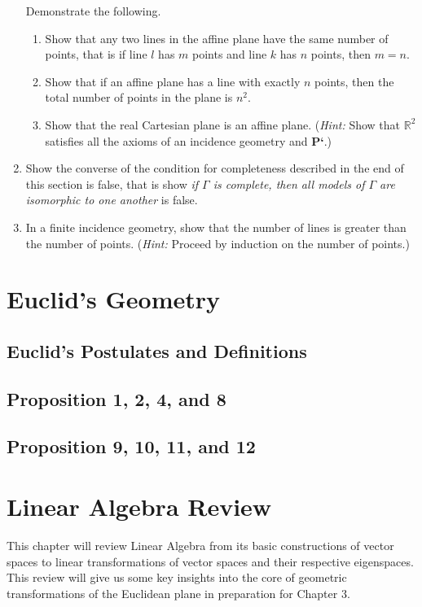 \documentclass[12pt]{book}
\def\R{{\mathbb{R}}}
\begin{document}
\begin{enumerate}
Demonstrate the following.
\begin{enumerate}
	\item Show that any two lines in the affine plane have the same number of points, that is if line $l$ has $m$ points and line $k$ has $n$ points, then $m=n$.
	\item Show that if an affine plane has a line with exactly $n$ points, then the total number of points in the plane is $n^2$.
	\item Show that the real Cartesian plane is an affine plane. (\textit{Hint:} Show that $\R^2$ satisfies all the axioms of an incidence geometry and \textbf{P`}.)
\end{enumerate}
\item Show the converse of the condition for completeness described in the end of this section is false, that is show \textit{if $\Gamma$ is complete, then all models of $\Gamma$ are isomorphic to one another} is false.
\item In a finite incidence geometry, show that the number of lines is greater than the number of points. (\textit{Hint:} Proceed by induction on the number of points.)
\end{enumerate}
	

\vfill
\pagebreak

\chapter{Euclid's Geometry}
\section{Euclid's Postulates and Definitions}
\section{Proposition 1, 2, 4, and 8}
\section{Proposition 9, 10, 11, and 12}

\chapter{Linear Algebra Review}

	This chapter will review Linear Algebra from its basic constructions of vector spaces to linear transformations of vector spaces and their respective eigenspaces. This review will give us some key insights into the core of geometric transformations of the Euclidean plane in preparation for Chapter 3. 
\end{document}
